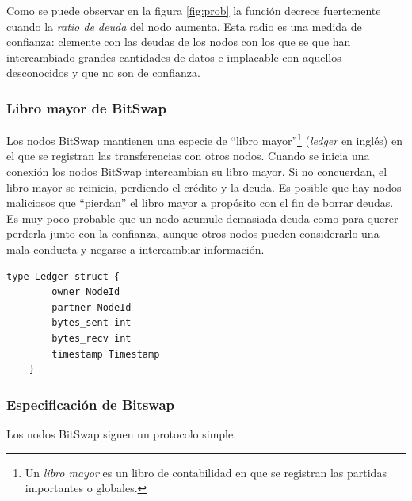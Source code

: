 \documentclass[12pt]{article} %
\begin{document}
Como se puede observar en la figura \ref{fig:prob} la función decrece fuertemente cuando la \textit{ratio de deuda} del nodo aumenta. Esta radio es una medida de confianza: clemente con las deudas de los nodos con los que se que han intercambiado grandes cantidades de datos e implacable con  aquellos desconocidos y que no son de confianza.


\subsubsection{Libro mayor de BitSwap} %
\label{ssub:libro_mayor_de_bitswap}

Los nodos BitSwap mantienen una especie de ``libro mayor''\footnote{Un \textit{libro mayor} es un libro de contabilidad en que se registran las partidas importantes o globales.} (\textit{ledger} en inglés) en el que se registran las transferencias con otros nodos. Cuando se inicia una conexión los nodos BitSwap intercambian su libro mayor. Si no concuerdan, el libro mayor se reinicia, perdiendo el crédito y la deuda. Es posible que hay nodos maliciosos que ``pierdan'' el libro mayor a propósito con el fin de borrar deudas. Es muy poco probable que un nodo acumule demasiada deuda como para querer perderla junto con la confianza, aunque otros nodos pueden considerarlo una mala conducta y negarse a intercambiar información.

\begin{lstlisting}[caption={Implementación del libro mayor.}, language=Golang]
	type Ledger struct {
		owner NodeId
		partner NodeId
		bytes_sent int
		bytes_recv int
		timestamp Timestamp
	}
\end{lstlisting}


\subsubsection{Especificación de Bitswap} %
\label{ssub:especificación_de_bitswap}

Los nodos BitSwap siguen un protocolo simple.
\end{document}

